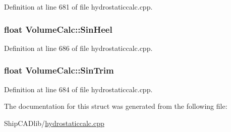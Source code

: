 Definition at line 681 of file hydrostaticcalc.\+cpp.

\subsubsection[{\texorpdfstring{Sin\+Heel}{SinHeel}}]{\setlength{\rightskip}{0pt plus 5cm}float Volume\+Calc\+::\+Sin\+Heel}\hypertarget{structVolumeCalc_ac1612ccb79673d6800b89a1acf46a028}{}\label{structVolumeCalc_ac1612ccb79673d6800b89a1acf46a028}


Definition at line 686 of file hydrostaticcalc.\+cpp.

\subsubsection[{\texorpdfstring{Sin\+Trim}{SinTrim}}]{\setlength{\rightskip}{0pt plus 5cm}float Volume\+Calc\+::\+Sin\+Trim}\hypertarget{structVolumeCalc_a36511f2f033b5488a4f677586f3e8f97}{}\label{structVolumeCalc_a36511f2f033b5488a4f677586f3e8f97}


Definition at line 684 of file hydrostaticcalc.\+cpp.



The documentation for this struct was generated from the following file\+:\begin{DoxyCompactItemize}
\item 
Ship\+C\+A\+Dlib/\hyperlink{hydrostaticcalc_8cpp}{hydrostaticcalc.\+cpp}\end{DoxyCompactItemize}
